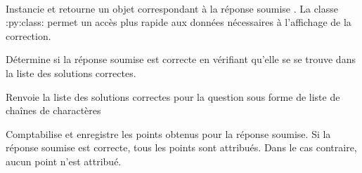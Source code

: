 \documentclass[a4,10pt,french]{sphinxmanual}
\begin{document}

\begin{fulllineitems}
\label{source:quiz.models.SqAnswer}
\end{fulllineitems}


\begin{fulllineitems}
\label{source:quiz.models.SqSubmit}~

\begin{fulllineitems}
\label{source:quiz.models.SqSubmit.build_correct}
Instancie et retourne un objet  correspondant à la réponse soumise .
La classe :py:class: permet un accès plus rapide aux données nécessaires à
l'affichage de la correction.

\end{fulllineitems}


\begin{fulllineitems}
\label{source:quiz.models.SqSubmit.correct}
Détermine si la réponse soumise est correcte en vérifiant qu'elle se
se trouve dans la liste des solutions correctes.

\end{fulllineitems}


\begin{fulllineitems}
\label{source:quiz.models.SqSubmit.get_corrections}
Renvoie la liste des solutions correctes pour la question sous forme de liste de
chaînes de charactères

\end{fulllineitems}


\begin{fulllineitems}
\label{source:quiz.models.SqSubmit.save_result}
Comptabilise et enregistre les points obtenus pour la réponse soumise. Si la réponse soumise
est correcte, tous les points sont attribués. Dans le cas contraire,
aucun point n'est attribué.


\end{fulllineitems}
\end{fulllineitems}
\end{document}
